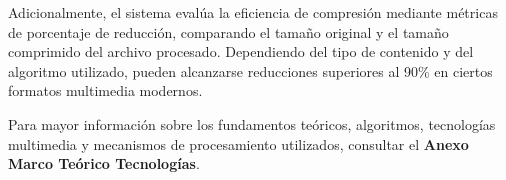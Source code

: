 Adicionalmente, el sistema evalúa la eficiencia de compresión mediante métricas de porcentaje de reducción, comparando el tamaño original y el tamaño comprimido del archivo procesado. Dependiendo del tipo de contenido y del algoritmo utilizado, pueden alcanzarse reducciones superiores al 90\% en ciertos formatos multimedia modernos.

Para mayor información sobre los fundamentos teóricos, algoritmos, tecnologías multimedia y mecanismos de procesamiento utilizados, consultar el \textbf{Anexo Marco Teórico Tecnologías}.